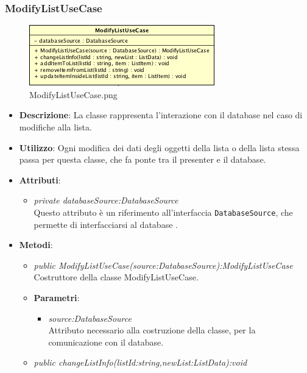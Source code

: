 \subsubsection{ModifyListUseCase}

\label{ModifyListUseCase}
\begin{figure}[ht]
	\centering
	\includegraphics[scale=0.5]{Sezioni/SottosezioniST/img/app/ModifyListUseCase.png}
	\caption{ModifyListUseCase.png}
\end{figure}

\begin{itemize}
\item \textbf{Descrizione}: La classe rappresenta l'interazione con il database nel caso di modifiche alla lista.
\item \textbf{Utilizzo}: Ogni modifica dei dati degli oggetti della lista o della lista stessa passa per questa classe, che fa ponte tra il presenter e il database.
\item \textbf{Attributi}: 
	\begin{itemize}
	\item \textit{private databaseSource:DatabaseSource}\\
	Questo attributo è un riferimento all'interfaccia \texttt{DatabaseSource}, che permette di interfacciarsi al database .
	\end{itemize}
\item \textbf{Metodi}:
	\begin{itemize}
	\item \textit{public ModifyListUseCase(source:DatabaseSource):ModifyListUseCase}\\
	Costruttore della classe ModifyListUseCase.
			\item{\textbf{Parametri}: \begin{itemize}
			\item \textit{source:DatabaseSource}\\
			Attributo necessario alla costruzione della classe, per la comunicazione con  il database.
			\end{itemize}}
	\item \textit{public changeListInfo(listId:string,newList:ListData):void}\\

\end{itemize}
\end{itemize}
